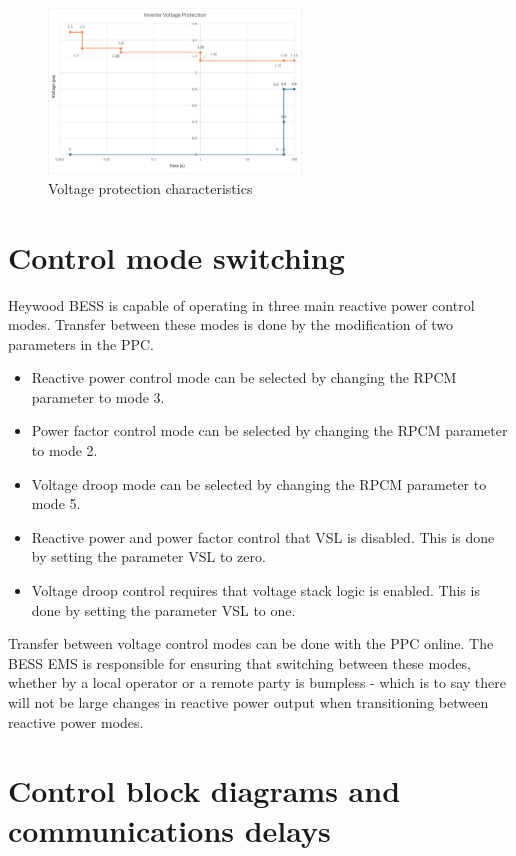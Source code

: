 \documentclass{../grid-link-report}
\begin{document}
	\begin{figure}[H]
		\centering
		\includegraphics[width=0.6\textwidth]{report-assets/images/vprotection-new.png}
		\caption{Voltage protection characteristics}
		\label{fig:vprotection}
	\end{figure}
	
	\chapter{Control mode switching}
	
	Heywood BESS is capable of operating in three main reactive power control modes. Transfer between these modes is done by the modification of two parameters in the PPC.
	
	\begin{itemize}
		\item Reactive power control mode can be selected by changing the RPCM parameter to mode 3.
		\item Power factor control mode can be selected by changing the RPCM parameter to mode 2.
		\item Voltage droop mode can be selected by changing the RPCM parameter to mode 5.
		\item Reactive power and power factor control that \ac{VSL} is disabled. This is done by setting the parameter VSL to zero.
		\item Voltage droop control requires that voltage stack logic is enabled. This is done by setting the parameter VSL to one.
	\end{itemize}
	
	Transfer between voltage control modes can be done with the PPC online. The BESS \ac{EMS} is responsible for ensuring that switching between these modes, whether by a local operator or a remote party is bumpless - which is to say there will not be large changes in reactive power output when transitioning between reactive power modes. 
	
	\chapter{Control block diagrams and communications delays}
	
\end{document}
